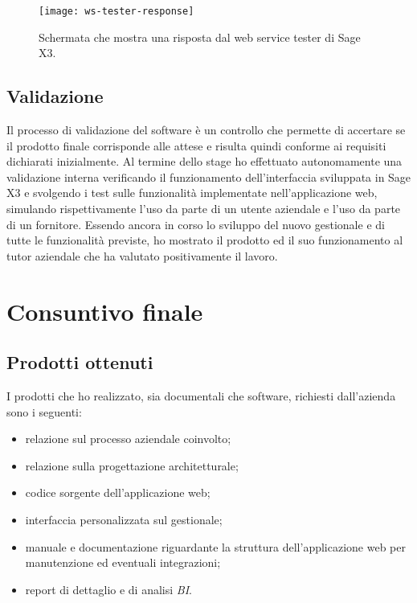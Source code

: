\begin{figure}[htbp]
	\begin{center}
		\texttt{[image: ws-tester-response]}
		\caption{Schermata che mostra una risposta dal web service tester di Sage X3.}
	\end{center}
\end{figure}

\newpage
\subsection{Validazione}
Il processo di validazione del software è un controllo che permette di accertare se il prodotto finale corrisponde alle attese e risulta quindi conforme ai requisiti dichiarati inizialmente.
Al termine dello stage ho effettuato autonomamente una validazione interna verificando il funzionamento dell'interfaccia sviluppata in Sage X3 e svolgendo i test sulle funzionalità implementate nell'applicazione web, simulando rispettivamente l'uso da parte di un utente aziendale e l'uso da parte di un fornitore.
Essendo ancora in corso lo sviluppo del nuovo gestionale e di tutte le funzionalità previste, ho mostrato il prodotto ed il suo funzionamento al tutor aziendale che ha valutato positivamente il lavoro.



\section{Consuntivo finale}

\subsection{Prodotti ottenuti}

I prodotti che ho realizzato, sia documentali che software, richiesti dall'azienda sono i seguenti:

\begin{itemize}
	\item relazione sul processo aziendale coinvolto;
	\item relazione sulla progettazione architetturale;
	\item codice sorgente dell'applicazione web;
	\item interfaccia personalizzata sul gestionale;
	\item manuale e documentazione riguardante la struttura dell'applicazione web per
	manutenzione ed eventuali integrazioni;
	\item report di dettaglio e di analisi \textit{BI}.
\end{itemize}

